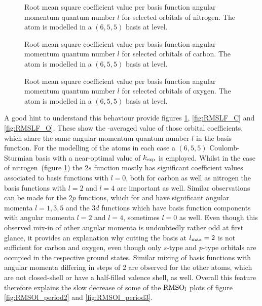 \begin{figure}
	\centering
	\caption[
		Root mean square coefficient value
		per angular momentum for nitrogen
	]
	{
		Root mean square coefficient value per
		basis function angular momentum quantum number $l$
		for selected orbitals of nitrogen.
		The atom is modelled
		in a $(6,5,5)$ \CS basis at \HF level.
	}
	\label{fig:RMSLF_N}
\end{figure}
\begin{figure}
	\centering
	\caption[
		Root mean square coefficient value
		per angular momentum for carbon
	]
	{
		Root mean square coefficient value per
		basis function angular momentum quantum number $l$
		for selected orbitals of carbon.
		The atom is modelled
		in a $(6,5,5)$ \CS basis at \HF level.
	}
	\label{fig:RMSLF_C}
\end{figure}
\begin{figure}
	\centering
	\caption[
		Root mean square coefficient value
		per angular momentum for oxygen
	]
	{
		Root mean square coefficient value per
		basis function angular momentum quantum number $l$
		for selected orbitals of oxygen.
		The atom is modelled
		in a $(6,5,5)$ \CS basis at \HF level.
	}
	\label{fig:RMSLF_O}
\end{figure}
A good hint to understand this behaviour provide figures
\ref{fig:RMSLF_N}, \vref{fig:RMSLF_C} and \vref{fig:RMSLF_O}.
These show the \RMS-averaged value of those orbital coefficients,
which share the same angular momentum quantum number $l$ in the basis function.
For the modelling of the atoms in each case
a $(6,5,5)$ Coulomb-Sturmian basis with a near-optimal value of $k_\text{exp}$ is employed.
Whilst in the case of nitrogen~(figure \ref{fig:RMSLF_N})
the $2s$ function mostly has significant coefficient values
associated to basis functions with $l=0$,
both for carbon as well as nitrogen
the basis functions with $l=2$ and $l=4$ are important as well.
Similar observations can be made for the $2p$ functions,
which for  and  have significant angular momenta
$l=1,3,5$ and the $3d$ functions which have basis function
components with angular momenta $l=2$ and $l=4$, sometimes $l=0$ as well.
Even though this observed mix-in of other angular momenta
is undoubtedly rather odd at first glance,
it provides an explanation why cutting the basis at $l_\text{max}=2$ is not
sufficient for carbon and oxygen,
even though only $s$-type and $p$-type \SCF orbitals are occupied
in the respective ground states.
Similar mixing of basis functions with angular momenta differing in steps of $2$
are observed for the other atoms,
which are not closed-shell
or have a half-filled valence shell, as well.
Overall this feature therefore
explains the slow decrease of some of the
$\text{RMSO}_l$ plots of figure \ref{fig:RMSOl_period2} and \ref{fig:RMSOl_period3}.

